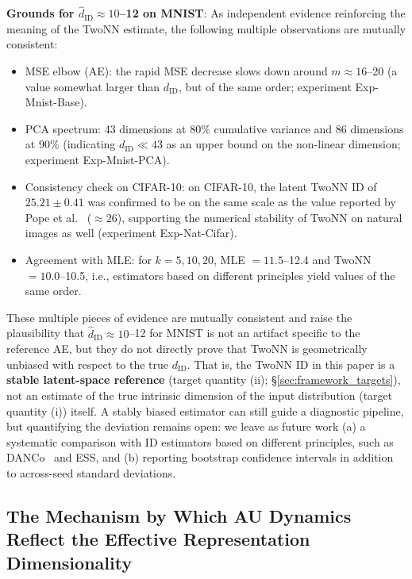 \documentclass[make,article,submit,pdftex,moreauthors]{Definitions/mdpi}
\begin{document}
\textbf{Grounds for $\hat{d}_\mathrm{ID} \approx 10$--12 on MNIST}:
As independent evidence reinforcing the meaning of the TwoNN estimate, the following
multiple observations are mutually consistent:
\begin{itemize}
  \item MSE elbow (AE): the rapid MSE decrease slows down around $m \approx 16$--20
        (a value somewhat larger than $d_\mathrm{ID}$, but of the same order; experiment
        Exp-Mnist-Base).
  \item PCA spectrum: 43 dimensions at 80\% cumulative variance and 86 dimensions at 90\%
        (indicating $d_\mathrm{ID} \ll 43$ as an upper bound on the non-linear dimension;
        experiment Exp-Mnist-PCA).
  \item Consistency check on CIFAR-10: on CIFAR-10, the latent TwoNN ID of $25.21\pm0.41$
        was confirmed to be on the same scale as the value reported by Pope et
        al.~\cite{pope2021intrinsic} ($\approx26$), supporting the numerical stability of
        TwoNN on natural images as well (experiment Exp-Nat-Cifar).
  \item Agreement with MLE: for $k=5,10,20$, MLE $=11.5$--12.4 and TwoNN $=10.0$--10.5,
        i.e., estimators based on different principles yield values of the same order.
\end{itemize}
These multiple pieces of evidence are mutually consistent and raise the plausibility
that $\hat{d}_\mathrm{ID} \approx 10$--12 for MNIST is not an artifact specific to the
reference AE, but they do not directly prove that TwoNN is geometrically unbiased with
respect to the true $d_\mathrm{ID}$.
That is, the TwoNN ID in this paper is a \textbf{stable latent-space reference}
(target quantity (ii); \S\ref{sec:framework_targets}), not an estimate of the true
intrinsic dimension of the input distribution (target quantity (i)) itself.
A stably biased estimator can still guide a diagnostic pipeline, but quantifying the
deviation remains open: we leave as future work
(a) a systematic comparison with ID estimators based on different principles, such as
DANCo~\cite{ceruti2014danco} and ESS, and
(b) reporting bootstrap confidence intervals in addition to across-seed standard
deviations.

\subsection{The Mechanism by Which AU Dynamics Reflect the Effective Representation Dimensionality}\label{sec:disc_au_dynamics}
\end{document}

